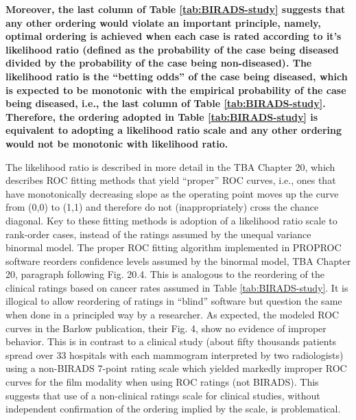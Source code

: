 \documentclass[
]{book}
\begin{document}
\textbf{Moreover, the last column of Table \ref{tab:BIRADS-study} suggests that any other ordering would violate an important principle, namely, optimal ordering is achieved when each case is rated according to it's likelihood ratio (defined as the probability of the case being diseased divided by the probability of the case being non-diseased). The likelihood ratio is the ``betting odds'' of the case being diseased, which is expected to be monotonic with the empirical probability of the case being diseased, i.e., the last column of Table \ref{tab:BIRADS-study}. Therefore, the ordering adopted in Table \ref{tab:BIRADS-study} is equivalent to adopting a likelihood ratio scale and any other ordering would not be monotonic with likelihood ratio.}

The likelihood ratio is described in more detail in the TBA Chapter 20, which describes ROC fitting methods that yield ``proper'' ROC curves, i.e., ones that have monotonically decreasing slope as the operating point moves up the curve from (0,0) to (1,1) and therefore do not (inappropriately) cross the chance diagonal. Key to these fitting methods is adoption of a likelihood ratio scale to rank-order cases, instead of the ratings assumed by the unequal variance binormal model. The proper ROC fitting algorithm implemented in PROPROC software reorders confidence levels assumed by the binormal model, TBA Chapter 20, paragraph following Fig. 20.4. This is analogous to the reordering of the clinical ratings based on cancer rates assumed in Table \ref{tab:BIRADS-study}. It is illogical to allow reordering of ratings in ``blind'' software but question the same when done in a principled way by a researcher. As expected, the modeled ROC curves in the Barlow publication, their Fig. 4, show no evidence of improper behavior. This is in contrast to a clinical study (about fifty thousands patients spread over 33 hospitals with each mammogram interpreted by two radiologists) using a non-BIRADS 7-point rating scale which yielded markedly improper ROC curves \citep{RN1784} for the film modality when using ROC ratings (not BIRADS). This suggests that use of a non-clinical ratings scale for clinical studies, without independent confirmation of the ordering implied by the scale, is problematical.
\end{document}

